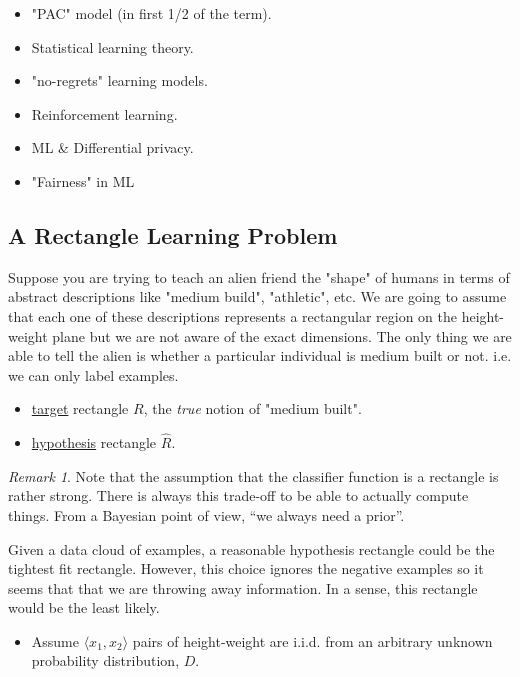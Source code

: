\documentclass[12pt, letterpaper]{article}
\numberwithin{equation}{section} %
\newcommand{\ul}{\underline}
\theoremstyle{definition}
\theoremstyle{remark}
\newtheorem{remark}[theorem]{Remark}
\begin{document}
\begin{itemize}
	\item "PAC" model (in first 1/2 of the term).
	\item Statistical learning theory.
	\item "no-regrets" learning models.
	\item Reinforcement learning.
	\item ML \& Differential privacy.
	\item "Fairness" in ML
\end{itemize}


\subsection{A Rectangle Learning Problem}

Suppose you are trying to teach an alien friend the "shape" of humans in terms of abstract descriptions like "medium build", "athletic", etc. 
We are going to assume that each one of these descriptions represents a rectangular region on the height-weight plane but we are not aware of the exact dimensions. 
The only thing we are able to tell the alien is whether a particular individual is medium built or not. i.e. we can only label examples.

\begin{itemize}
	\item \ul{target} rectangle $R$, the \emph{true} notion of "medium built".
	\item \ul{hypothesis} rectangle $\hat R$. 
\end{itemize}

\begin{remark}
	Note that the assumption that the classifier function is a rectangle is rather strong. 
	There is always this trade-off to be able to actually compute things. 
	From a Bayesian point of view, ``we always need a prior''.
\end{remark}

Given a data cloud of examples, a reasonable hypothesis rectangle could be the tightest fit rectangle. 
However, this choice ignores the negative examples so it seems that that we are throwing away information. 
In a sense, this rectangle would be the least likely.

\begin{itemize}
	\item Assume $\langle x_1,x_2 \rangle$ pairs of height-weight are i.i.d. from an arbitrary unknown probability distribution, $D$.
\end{itemize}
\end{document}
